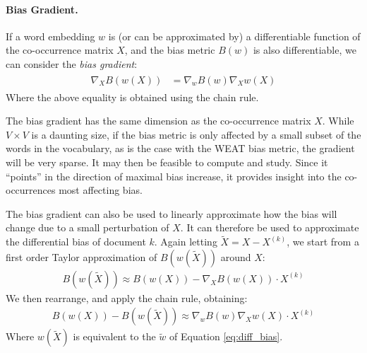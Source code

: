 \documentclass{article}
\newcommand{\xhdr}[1]{\paragraph*{\bf {#1.}}}
\begin{document}
\xhdr{Bias Gradient}
If a word embedding $w$ is (or can be approximated by) a differentiable function of the co-occurrence matrix $X$, and the bias metric $B(w)$ is also differentiable, we can consider the \textit{bias gradient}:
\begin{align}
\label{eq:bias_grad}
\begin{split}
\nabla_{X} B(w(X)) &=  \nabla_{w} B(w) \nabla_{X} w(X)
\end{split}
\end{align}
Where the above equality is obtained using the chain rule.

The bias gradient has the same dimension as the co-occurrence matrix $X$.
While $V \times V$ is a daunting size, if the bias metric is only affected by a small subset of the words in the vocabulary, as is the case with the WEAT bias metric, the gradient will be very sparse. 
It may then be feasible to compute and study.
Since it ``points'' in the direction of maximal bias increase, it provides insight into the co-occurrences most affecting bias.

The bias gradient can also be used to linearly approximate how the bias will change due to a small perturbation of $X$. It can therefore be used to approximate the differential bias of document $k$. Again letting $\tilde{X} = X - X^{(k)}$, we start from a first order Taylor approximation
of $B(w(\tilde{X}))$ around $X$:
\begin{align*}
B(w(\tilde{X})) \approx B(w(X)) - \nabla_X B(w(X)) \cdot X^{(k)}
\end{align*}
We then rearrange, and apply the chain rule, obtaining:
\begin{align*}%
B(w(X)) - B(w(\tilde{X})) \approx \nabla_{w} B(w) \nabla_{X} w(X) \cdot X^{(k)}
\end{align*}
Where $w(\tilde{X})$ is equivalent to the $\tilde{w}$ of Equation \eqref{eq:diff_bias}.
\end{document}
